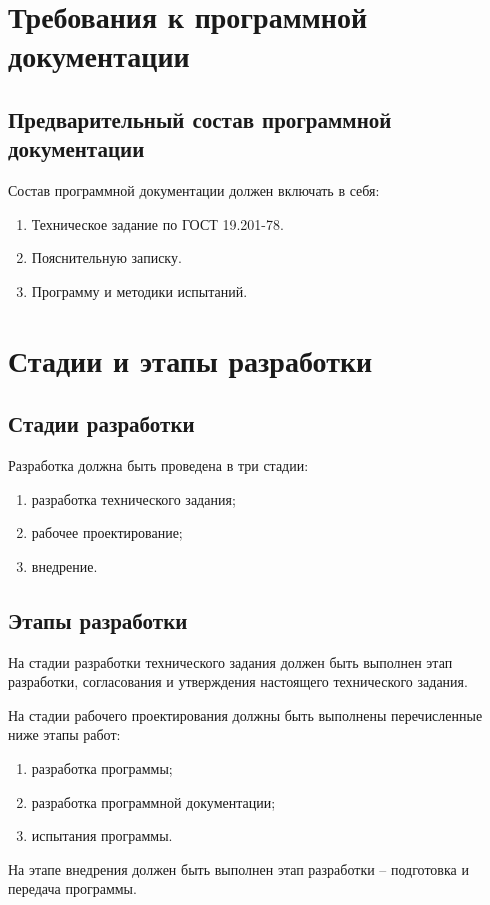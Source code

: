 \chapter{Требования к программной документации}
\section{Предварительный состав программной документации}
Состав программной документации должен включать в себя:
\begin{enumerate}
    \item Техническое задание по ГОСТ 19.201-78.
    \item Пояснительную записку.
    \item Программу и методики испытаний.
\end{enumerate}

\chapter{Стадии и этапы разработки}
\section{Стадии разработки}
Разработка должна быть проведена в три стадии:
\begin{enumerate}
    \item разработка технического задания;
    \item рабочее проектирование;
    \item внедрение.
\end{enumerate}

\section{Этапы разработки}
На стадии разработки технического задания должен быть выполнен этап разработки, согласования и утверждения 
настоящего технического задания.

На стадии рабочего проектирования должны быть выполнены перечисленные ниже этапы работ:
\begin{enumerate}
    \item разработка программы;
    \item разработка программной документации;
    \item испытания программы.
\end{enumerate}

На этапе внедрения должен быть выполнен этап разработки -- подготовка и передача программы.

